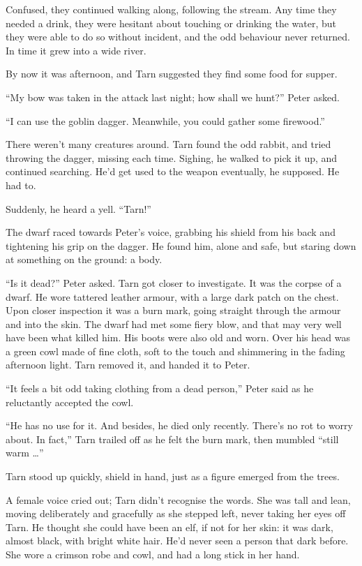 Confused, they continued walking along, following the stream.  Any time they needed a drink, they were hesitant about touching or drinking the water, but they were able to do so without incident, and the odd behaviour never returned.  In time it grew into a wide river.


By now it was afternoon, and Tarn suggested they find some food for supper.

``My bow was taken in the attack last night; how shall we hunt?'' Peter asked.

``I can use the goblin dagger.  Meanwhile, you could gather some firewood.''

There weren't many creatures around.  Tarn found the odd rabbit, and tried throwing the dagger, missing each time.  Sighing, he walked to pick it up, and continued searching.  He'd get used to the weapon eventually, he supposed.  He had to.

Suddenly, he heard a yell.  ``Tarn!''

The dwarf raced towards Peter's voice, grabbing his shield from his back and tightening his grip on the dagger.  He found him, alone and safe, but staring down at something on the ground: a body.

``Is it dead?'' Peter asked.  Tarn got closer to investigate. It was the corpse of a dwarf.  
He wore tattered leather armour, with a large dark patch on the chest.  Upon closer inspection it was a burn mark, going straight through the armour and into the skin.  The dwarf had met some fiery blow, and that may very well have been what killed him.  His boots were also old and worn.  Over his head was a green cowl made of fine cloth, soft to the touch and shimmering in the fading afternoon light.  Tarn removed it, and handed it to Peter.

``It feels a bit odd taking clothing from a dead person,'' Peter said as he reluctantly accepted the cowl.

``He has no use for it.  And besides, he died only recently.  There's no rot to worry about.  In fact,'' Tarn trailed off as he felt the burn mark, then mumbled ``still warm  \ldots''

Tarn stood up quickly, shield in hand, just as a figure emerged from the trees.

A female voice cried out; Tarn didn't recognise the words.  She was tall and lean, moving deliberately and gracefully as she stepped left, never taking her eyes off Tarn.  He thought she could have been an elf, if not for her skin: it was dark, almost black, with bright white hair.  He'd never seen a person that dark before.  She wore a crimson robe and cowl, and had a long stick in her hand.

